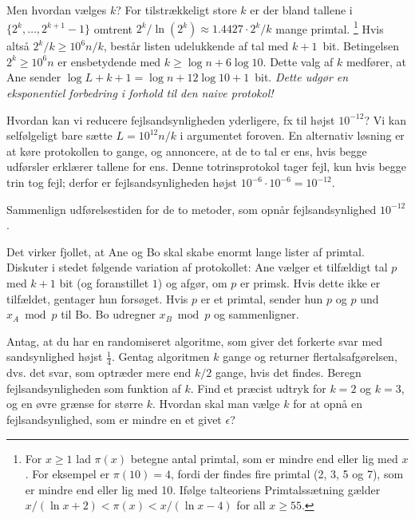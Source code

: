 Men hvordan vælges $k$?
For tilstrækkeligt store $k$ er der bland tallene i $\{2^k,\ldots,2^{k+1}-1\}$ omtrent $2^k/\ln(2^k)\approx \num{1,4427}\cdot 2^k/k$ mange primtal.%
\footnote{For $x\ge1$ lad $\pi(x)$ betegne antal primtal, som er mindre end eller lig med $x$.
For eksempel er $\pi(10) = 4$, fordi der findes fire primtal (2, 3, 5 og 7), som er mindre end eller lig med 10.
Ifølge talteoriens Primtalssætning gælder $x/(\ln x + 2) < \pi(x) < x/(\ln x - 4)$ for all $x\ge 55$.
}
Hvis altså $2^k/k  \ge  10^6 n/k$, består listen udelukkende af tal med $k+1$~bit.
Betingelsen $2^k \ge  10^6 n$ er ensbetydende med $k \ge \log n + 6\log 10$.
Dette valg af $k$ medfører, at Ane sender  $\log L + k + 1 = \log n + 12 \log 10 + 1$~bit.
\emph{Dette udgør en eksponentiel forbedring i forhold til den naive protokol!}

Hvordan kan vi reducere fejlsandsynligheden yderligere, fx til højst $10^{-12}$?
Vi kan selfølgeligt bare sætte $L = 10^{12} n/k$ i argumentet foroven.
En alternativ løsning er at køre protokollen to gange, og annoncere, at de to tal er ens, hvis begge udførsler erklærer tallene for ens.
Denne totrinsprotokol tager fejl, kun hvis begge trin tog fejl; derfor er fejlsandsynligheden
højst $10^{-6} \cdot 10^{-6} = 10^{-12}$.  


\begin{exerc}
  Sammenlign udførelsestiden for de to metoder, som opnår fejlsandsynlighed $10^{-12}$.
\end{exerc}

\begin{exerc} 
  Det virker fjollet, at Ane og Bo skal skabe enormt lange lister af primtal.
  Diskuter i stedet følgende variation af protokollet:
  Ane vælger et tilfældigt tal $p$ med $k+1$ bit (og foranstillet $1$) og afgør, om $p$ er primsk.
  Hvis dette ikke er tilfældet, gentager hun forsøget.
  Hvis $p$ er et primtal, sender hun $p$ og $p$ und $x_A\bmod p$ til Bo.
  Bo udregner $x_B\bmod p$ og sammenligner. 
\end{exerc}

\begin{exerc} 
  Antag, at du har en randomiseret algoritme, som giver det forkerte svar med sandsynlighed højst $\frac14$.
  Gentag algoritmen $k$ gange og returner flertalsafgørelsen, dvs. det svar, som optræder mere end $k/2$ gange, hvis det findes. 
  Beregn fejlsandsynligheden som funktion af $k$.
  Find et præcist udtryk for  $k=2$ og $k=3$, og en øvre grænse for større $k$.
  Hvordan skal man vælge $k$ for at opnå en fejlsandsynlighed, som er mindre en et givet $\epsilon$?
\end{exerc}

